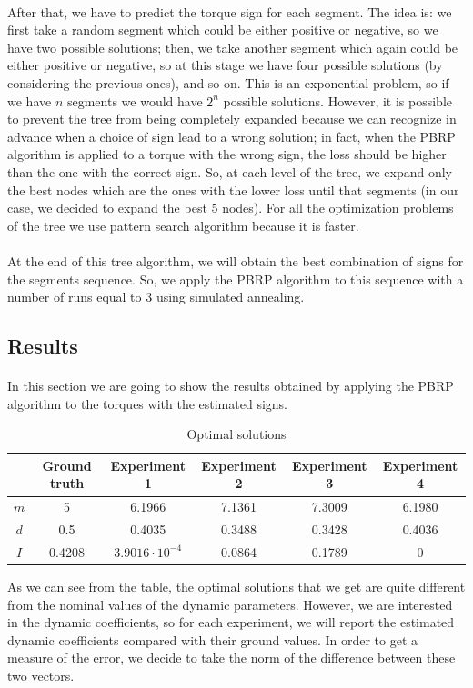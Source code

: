 \documentclass{article}
\begin{document}
\paragraph{}After that, we have to predict the torque sign for each segment. The idea is: we first take a random segment which could be either positive or negative, so we have two possible solutions; then, we take another segment which again could be either positive or negative, so at this stage we have four possible solutions (by considering the previous ones), and so on. This is an exponential problem, so if we have $n$ segments we would have $2^n$ possible solutions. However, it is possible to prevent the tree from being completely expanded because we can recognize in advance when a choice of sign lead to a wrong solution; in fact, when the PBRP algorithm is applied to a torque with the wrong sign, the loss should be higher than the one with the correct sign. So, at each level of the tree, we expand only the best nodes which are the ones with the lower loss until that segments (in our case, we decided to expand the best 5 nodes). For all the optimization problems of the tree we use pattern search algorithm because it is faster.
\paragraph{}At the end of this tree algorithm, we will obtain the best combination of signs for the segments sequence. So, we apply the PBRP algorithm to this sequence with a number of runs equal to 3 using simulated annealing.

\subsection{Results}
\paragraph{}In this section we are going to show the results obtained by applying the PBRP algorithm to the torques with the estimated signs.
\FloatBarrier
\begin{table}[!htbp]
\centering
\begin{tabular}{|c|ccccc|}
\hline
& Ground truth & Experiment 1 & Experiment 2 & Experiment 3 & Experiment 4\\
\hline
$m$ & 5 & 6.1966 & 7.1361 & 7.3009 & 6.1980\\ 
$d$ & 0.5 & 0.4035 & 0.3488 & 0.3428 & 0.4036\\
$I$ & 0.4208 & $3.9016\cdot 10^{-4}$ & 0.0864 & 0.1789 & 0\\
\hline
\end{tabular}
\caption{Optimal solutions}
\end{table}
\FloatBarrier
As we can see from the table, the optimal solutions that we get are quite different from the nominal values of the dynamic parameters. However, we are interested in the dynamic coefficients, so for each experiment, we will report the estimated dynamic coefficients compared with their ground values. In order to get a measure of the error, we decide to take the norm of the difference between these two vectors.
\end{document}
